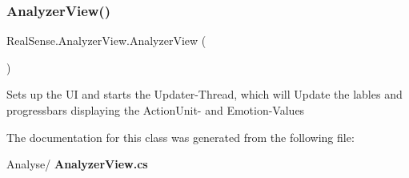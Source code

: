\subsubsection{Analyzer\+View()}
{\footnotesize\ttfamily Real\+Sense.\+Analyzer\+View.\+Analyzer\+View (\begin{DoxyParamCaption}{ }\end{DoxyParamCaption})}

Sets up the UI and starts the Updater-\/\+Thread, which will Update the lables and progressbars displaying the Action\+Unit-\/ and Emotion-\/\+Values 

The documentation for this class was generated from the following file\+:\begin{DoxyCompactItemize}
\item 
Analyse/\textbf{ Analyzer\+View.\+cs}\end{DoxyCompactItemize}
